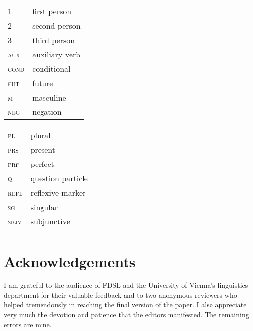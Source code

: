 \documentclass[output=paper,
colorlinks,
citecolor=brown,
newtxmath
]{langscibook}
\begin{document}
\begin{tabularx}{.45\textwidth}{lX}
\textsc{1}&first person\\
\textsc{2}&second person\\
\textsc{3}&third person\\
\textsc{aux}&auxiliary verb\\
\textsc{cond}&conditional\\
\textsc{fut}&future\\
\textsc{m}&masculine\\
\textsc{neg}&negation\\
\end{tabularx}
\begin{tabularx}{.45\textwidth}{lX}
\textsc{pl}&plural\\
\textsc{prs}&present\\
\textsc{prf}&perfect\\
\textsc{q}&question particle\\
\textsc{refl}&reflexive marker\\
\textsc{sg}&singular\\
\textsc{sbjv}&subjunctive\\
&\\
\end{tabularx}

\section*{Acknowledgements}

I am grateful to the audience of FDSL and the University of Vienna's linguistics department for their valuable feedback and to two anonymous reviewers who helped tremendously in reaching the final version of the paper. I also appreciate very much the devotion and patience that the editors manifested. The remaining errors are mine.

\sloppy
\printbibliography[heading=subbibliography,notkeyword=this]
\end{document}
